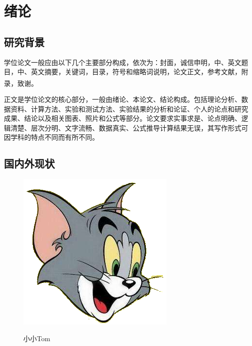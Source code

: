 \documentclass{buctart}
\begin{document}
\startmain
\section{绪论}
\subsection{研究背景}{\par
	学位论文一般应由以下几个主要部分构成，依次为：封面，诚信申明，中、英文题目，中、英文摘要，关键词，目录，符号和缩略词说明，论文正文，参考文献，附录，致谢\textsuperscript{\cite{zjsw}}。\par
	正文是学位论文的核心部分，一般由绪论、本论文、结论构成。包括理论分析、数据资料、计算方法、实验和测试方法、实验结果的分析和论证、个人的论点和研究成果、结论以及相关图表、照片和公式等部分。论文要求实事求是、论点明确、逻辑清楚、层次分明、文字流畅、数据真实、公式推导计算结果无误，其写作形式可因学科的特点不同而有所不同。\par}
\subsection{国内外现状}{
}
	\begin{figure}[htbp]
		\begin{center}
			\includegraphics[scale=0.8]{image/tom.jpeg}\\
			\caption{小小Tom}
			\label{fig1-tom}
		\end{center}
	\end{figure}
	
\end{document}
